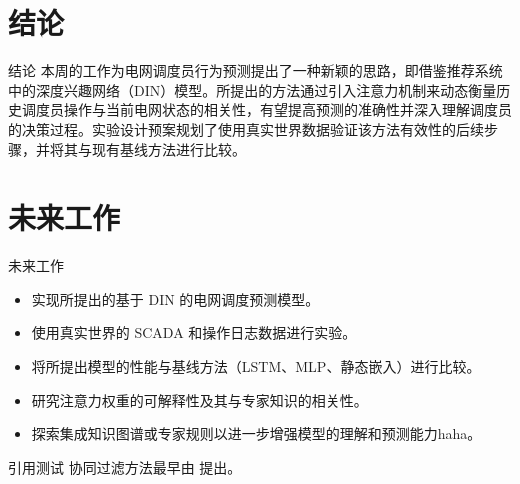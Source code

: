 \documentclass[11pt]{beamer}
\begin{document}
\section{结论}

\begin{frame}{结论}
 本周的工作为电网调度员行为预测提出了一种新颖的思路，即借鉴推荐系统中的深度兴趣网络（DIN）\cite{raffel2020exploring}模型\cite{wang2013learning}。所提出的方法通过引入注意力机制来动态衡量历史调度员操作与当前电网状态的相关性，有望提高预测的准确性并深入理解调度员的决策过程。实验设计预案规划了使用真实世界数据验证该方法有效性的后续步骤，并将其与现有基线方法进行比较。
\end{frame}

\section{未来工作}

\begin{frame}{未来工作}
 \begin{itemize}
  \item 实现所提出的基于 DIN 的电网调度预测模型。
  \item 使用真实世界的 SCADA 和操作日志数据进行实验。
  \item 将所提出模型的性能与基线方法（LSTM、MLP、静态嵌入）进行比较。
  \item 研究注意力权重的可解释性及其与专家知识的相关性。
  \item 探索集成知识图谱或专家规则以进一步增强模型的理解和预测能力haha。
 \end{itemize}
\end{frame}


\begin{frame}{引用测试}
  协同过滤方法最早由 \cite{hu2008collaborative}提出。
\end{frame}



    
\end{document}
